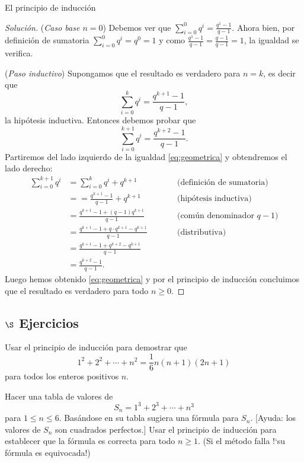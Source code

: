\begin{section}{El principio de inducción}
\begin{ejemplo*}
\begin{proof}[Solución]
    \noindent(\textit{Caso  base $n=0$}) Debemos ver que $\sum_{i=0}^0 q^i = \frac{q^{1} -1}{q -1}$. Ahora bien,  por definición de sumatoria $\sum_{i=0}^0 q^i= q^0 = 1$ y como $\frac{q^{1} -1}{q -1} = \frac{q -1}{q -1}= 1$, la igualdad se verifica.
        
    \noindent (\textit{Paso  inductivo}) Supongamos que el resultado es verdadero para $n=k$, es decir que 
    \begin{equation}
        \sum_{i=0}^k q^i = \frac{q^{k+1} -1}{q -1} \tag{HI},
    \end{equation}
    la hipótesis inductiva. Entonces debemos probar que 
    \begin{equation}
        \sum_{i=0}^{k+1} q^i = \frac{q^{k+2} -1}{q -1} . \label{eq:geometrica}
    \end{equation}
    Partiremos del lado izquierdo de la igualdad \eqref{eq:geometrica} y obtendremos el lado derecho:
    \begin{align*}
        \sum_{i=0}^{k+1} q^i  &= \sum_{i=0}^k q^i + q^{k+1} &\qquad  &\text{(definición de sumatoria)} \\
            &=  = \frac{q^{k+1} -1}{q -1}  +  q^{k+1}&\qquad &\text{(hipótesis inductiva)} \\
            &=  \frac{q^{k+1} -1 + (q-1)q^{k+1}}{q -1} &\qquad  & \text{(común denominador $q-1$)} \\ 
            &=  \frac{q^{k+1} -1 + q\cdot q^{k+1}- q^{k+1}}{q -1} &\qquad  & \text{(distributiva)} \\
            &=  \frac{q^{k+1} -1 + q^{k+2}- q^{k+1}}{q -1} &\qquad  &\\
            &=  \frac{q^{k+2}- 1}{q -1}. &\qquad  &
    \end{align*}
    Luego hemos obtenido  \eqref{eq:geometrica} y por el principio de inducción concluimos que el resultado es verdadero para todo $n\ge 0$.
    \end{proof}
    \end{ejemplo*}

\subsection*{$\S$ Ejercicios}

\begin{enumex}
\item Usar el principio de inducción para demostrar que
$$
1^2+2^2+\cdots +n^2 = \frac16 n(n+1)(2n +1)
$$
para todos los enteros positivos $n$.

\item Hacer una tabla de valores de
$$
S_n = 1^3+2^3+\cdots +n^3
$$
para $1 \le n\le 6$. Basándose en su tabla sugiera una fórmula para $S_n$. [Ayuda: los valores de $S_n$ son cuadrados perfectos.] Usar el principio de inducción para establecer que la fórmula es correcta para todo $n\ge 1$. (Si el método falla !`su fórmula es equivocada!)


\end{enumex}
\end{section}
